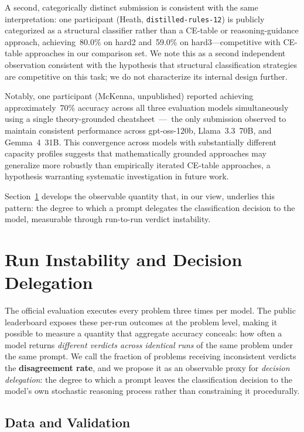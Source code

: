 \documentclass[11pt]{article}
\begin{document}
A second, categorically distinct submission is consistent with the
same interpretation: one participant (Heath, \texttt{distilled-rules-12})
is publicly categorized as a structural classifier rather than a
CE-table or reasoning-guidance approach, achieving~80.0\% on hard2
and~59.0\% on hard3---competitive with CE-table approaches in our
comparison set. We note this as a second independent observation
consistent with the hypothesis that structural classification
strategies are competitive on this task; we do not characterize its
internal design further.

Notably, one participant (McKenna, unpublished) reported achieving
approximately~70\% accuracy across all three evaluation models
simultaneously using a single theory-grounded cheatsheet~---~the only
submission observed to maintain consistent performance across
gpt-oss-120b, Llama~3.3~70B, and Gemma~4~31B. This convergence across
models with substantially different capacity profiles suggests that
mathematically grounded approaches may generalize more robustly than
empirically iterated CE-table approaches, a hypothesis warranting
systematic investigation in future work.


Section~\ref{sec:instability} develops the observable quantity that,
in our view, underlies this pattern: the degree to which a prompt
delegates the classification decision to the model, measurable through
run-to-run verdict instability.

\section{Run Instability and Decision Delegation}
\label{sec:instability}

The official evaluation executes every problem three times per model.
The public leaderboard exposes these per-run outcomes at the problem
level, making it possible to measure a quantity that aggregate accuracy
conceals: how often a model returns \emph{different verdicts across
identical runs} of the same problem under the same prompt. We call the
fraction of problems receiving inconsistent verdicts the
\textbf{disagreement rate}, and we propose it as an observable proxy
for \emph{decision delegation}: the degree to which a prompt leaves the
classification decision to the model's own stochastic reasoning process
rather than constraining it procedurally.

\subsection{Data and Validation}
\label{sec:instability-data}
\end{document}
